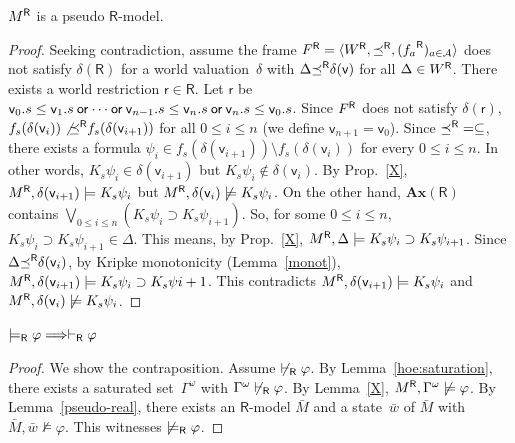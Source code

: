 \begin{lemma}
 ${M}^{\mathsf R}$ is a pseudo $\mathsf R$-model.
\end{lemma}
\begin{proof}
 Seeking contradiction,
 assume the frame ${F}^{\mathsf R} = \langle{{W}^{\mathsf R}, {\preceq}^{\mathsf R}, ({f_a}^{\mathsf R})_{a\in\mathcal A}}\rangle$
 does not satisfy $\delta(\mathsf R)$ for
 a world valuation~$\delta$ with
 $\Delta{\preceq}^{\mathsf R}\delta(\mathsf v)$ for all $\Delta\in{W}^{\mathsf R}$.
 There exists a world restriction
 $\mathsf r\in\mathsf R$.
 Let $\mathsf r$ be $\mathsf v_0.s\le\mathsf v_1.s\mathbin{\mathsf{or}}\cdots \mathbin{\mathsf{or}}\mathsf
 v_{n-1}.s\le\mathsf v_n.s\mathbin{\mathsf{or}}\mathsf v_n.s\le\mathsf v_0.s$.
 Since ${F}^{\mathsf R}$ does not satisfy $\delta(\mathsf r)$,
 $f_s(\delta(\mathsf v_i))\not{{\preceq}^{\mathsf R}}f_s(\delta(\mathsf v_{i+1}))$
 for
 all $0\le i\le n$ (we define $\mathsf v_{n+1} = \mathsf v_0$).
 Since ${\preceq}^{\mathsf R} = \subseteq$, there exists
 a formula $\psi_i\in f_s(\delta(\mathsf v_{i+1}))\setminus
 f_s(\delta(\mathsf v_i))$ for every $0\le i\le n$.
 In other words, $K_s\psi_i\in\delta(\mathsf v_{i+1})$
 but $K_s\psi_i\notin\delta(\mathsf v_i)$.
 By Prop.~\ref{X},
 ${M}^{\mathsf R},\delta(\mathsf v_{i+1})\models K_s\psi_i$ but
 ${M}^{\mathsf R},\delta(\mathsf v_{i})\not\models K_s\psi_i$.
 On the other hand, $\mathbf{Ax}(\mathsf R)$ contains
 $\bigvee_{0\le i\le n}\left(K_s\psi_i\supset K_s\psi_{i+1}\right)$.
 So, for some $0\le i\le n$,
 $K_s\psi_i\supset K_s\psi_{i+1}\in\Delta$.
 This means, by Prop.~\ref{X},
 ${M}^{\mathsf R},\Delta\models K_s\psi_i\supset K_s\psi_{i+1}$.
 Since $\Delta{\preceq}^{\mathsf R}\delta(\mathsf v_i)$,
 by Kripke monotonicity (Lemma~\ref{monot}),
 ${M}^{\mathsf R},\delta(\mathsf v_{i+1})\models K_s\psi_i\supset K_s\psi{i+1}$.
 This contradicts ${M}^{\mathsf R},\delta(\mathsf v_{i+1})\models K_s\psi_i$ and
 ${M}^{\mathsf R},\delta(\mathsf v_i)\not\models K_s\psi_i$.
\end{proof}
 
\begin{lemma}[Completeness]
 $\models_{\mathsf R}\varphi\Longrightarrow\vdash_{\mathsf R}\varphi$
\end{lemma}
\begin{proof}
 We show the contraposition.
 Assume $\not\vdash_{\mathsf R} \varphi$. By
 Lemma~\ref{hoe:saturation}, there exists
 a saturated set~$\Gamma^\omega$ with $\Gamma^\omega\not\vdash_{\mathsf R}\varphi$.
 By Lemma~\ref{X}, ${M}^{\mathsf R}, \Gamma^\omega\not\models\varphi$.
 By Lemma~\ref{pseudo-real}, there exists an
 $\mathsf R$-model $\bar M$ and a state~$\bar w$ of $\bar M$
 with $\bar M,\bar w\not\models \varphi$.
 This witnesses $\not\models_{\mathsf R}\varphi$.
\end{proof}


